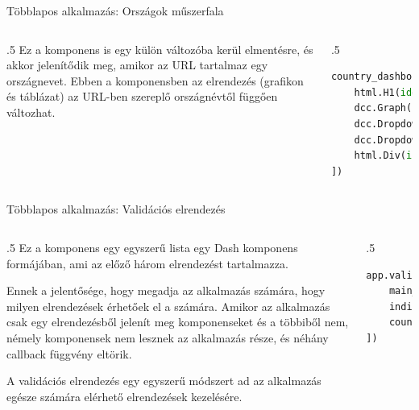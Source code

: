\documentclass[english, aspectratio=169]{beamer}
\begin{document}
\begin{frame}[fragile]{Többlapos alkalmazás: Országok műszerfala}
	\begin{columns}
		\begin{column}{.5\textwidth}
			Ez a komponens is egy külön változóba kerül elmentésre, és akkor jelenítődik meg, amikor az URL tartalmaz egy országnevet. Ebben a komponensben az elrendezés (grafikon és táblázat) az URL-ben szereplő országnévtől függően változhat. 
		\end{column}
		\begin{column}{.5\textwidth}
			\begin{lstlisting}[language=python]
country_dashboard = html.Div([
	html.H1(id='country_heading'),
	dcc.Graph(id='country_page_graph'),
	dcc.Dropdown(id='country_page_indicator_dropdown'),
	dcc.Dropdown(id='country_page_contry_dropdown'),
	html.Div(id='country_table')
])
			\end{lstlisting}
		\end{column}
	\end{columns}
\end{frame}

\begin{frame}[fragile]{Többlapos alkalmazás: Validációs elrendezés}
	\begin{columns}
		\begin{column}{.5\textwidth}
			Ez a komponens egy egyszerű lista egy Dash komponens formájában, ami az előző három elrendezést tartalmazza.\par\smallskip 
			Ennek a jelentősége, hogy megadja az alkalmazás számára, hogy milyen elrendezések érhetőek el a számára. Amikor az alkalmazás csak egy elrendezésből jelenít meg komponenseket és a többiből nem, némely komponensek nem lesznek az alkalmazás része, és néhány callback függvény eltörik.\par\smallskip
			A validációs elrendezés egy egyszerű módszert ad az alkalmazás egésze számára elérhető elrendezések kezelésére. 
		\end{column}
		\begin{column}{.5\textwidth}
			\begin{lstlisting}[language=python]
app.validation_layout = html.Div([
	main_layout,
	indicators_dashboard,
	country_dashboard,
])
			\end{lstlisting}
		\end{column}
	\end{columns}
\end{frame}
\end{document}
